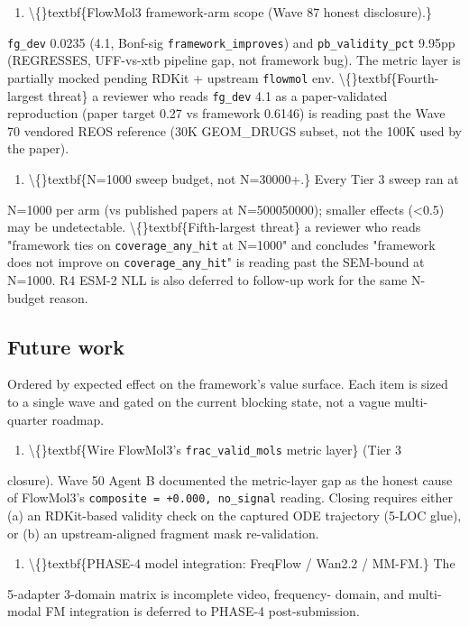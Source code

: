 \documentclass[preprint,3p,times,twocolumn]{elsarticle}
\begin{document}
\begin{enumerate}
\item \textbackslash\{\}textbf\{FlowMol3 framework-arm scope (Wave 87 honest disclosure).\}
\end{enumerate}
\texttt{fg\_dev} 0.0235 (4.1, Bonf-sig \texttt{framework\_improves}) and \texttt{pb\_validity\_pct} 9.95pp (REGRESSES, UFF-vs-xtb pipeline gap, not framework bug). The metric layer is partially mocked pending RDKit + upstream \texttt{flowmol} env. \textbackslash\{\}textbf\{Fourth-largest threat\}  a reviewer who reads \texttt{fg\_dev} 4.1 as a paper-validated reproduction (paper target 0.27 vs framework 0.6146) is reading past the Wave 70 vendored REOS reference (30K GEOM\_DRUGS subset, not the 100K used by the paper).

\begin{enumerate}
\item \textbackslash\{\}textbf\{N=1000 sweep budget, not N=30000+.\} Every Tier 3 sweep ran at
\end{enumerate}
N=1000 per arm (vs published papers at N=500050000); smaller effects (<0.5) may be undetectable. \textbackslash\{\}textbf\{Fifth-largest threat\}  a reviewer who reads "framework ties on \texttt{coverage\_any\_hit} at N=1000" and concludes "framework does not improve on \texttt{coverage\_any\_hit}" is reading past the SEM-bound at N=1000. R4 ESM-2 NLL is also deferred to follow-up work for the same N-budget reason.

\subsection{Future work}
Ordered by expected effect on the framework's value surface. Each item is sized to a single wave and gated on the current blocking state, not a vague multi-quarter roadmap.

\begin{enumerate}
\item \textbackslash\{\}textbf\{Wire FlowMol3's \texttt{frac\_valid\_mols} metric layer\} (Tier 3
\end{enumerate}
closure). Wave 50 Agent B documented the metric-layer gap as the honest cause of FlowMol3's \texttt{composite = +0.000, no\_signal} reading. Closing requires either (a) an RDKit-based validity check on the captured ODE trajectory (5-LOC glue), or (b) an upstream-aligned fragment mask re-validation.

\begin{enumerate}
\item \textbackslash\{\}textbf\{PHASE-4 model integration: FreqFlow / Wan2.2 / MM-FM.\} The
\end{enumerate}
5-adapter  3-domain matrix is incomplete  video, frequency- domain, and multi-modal FM integration is deferred to PHASE-4 post-submission.
\end{document}
